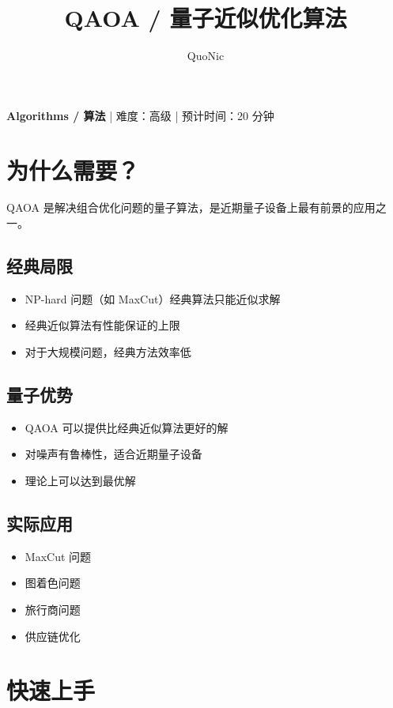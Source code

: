 \documentclass[12pt,a4paper]{article}
\title{QAOA / 量子近似优化算法}
\author{QuoNic}
\date{}
\begin{document}
\maketitle

\begin{center}
\textbf{Algorithms / 算法} | 难度：高级 | 预计时间：20 分钟
\end{center}

\tableofcontents
\newpage

\section{为什么需要？}

QAOA 是解决组合优化问题的量子算法，是近期量子设备上最有前景的应用之一。

\subsection{经典局限}
\begin{itemize}
  \item NP-hard 问题（如 MaxCut）经典算法只能近似求解
  \item 经典近似算法有性能保证的上限
  \item 对于大规模问题，经典方法效率低
\end{itemize}

\subsection{量子优势}
\begin{itemize}
  \item QAOA 可以提供比经典近似算法更好的解
  \item 对噪声有鲁棒性，适合近期量子设备
  \item 理论上可以达到最优解
\end{itemize}

\subsection{实际应用}
\begin{itemize}
  \item MaxCut 问题
  \item 图着色问题
  \item 旅行商问题
  \item 供应链优化
\end{itemize}

\section{快速上手}
\end{document}
